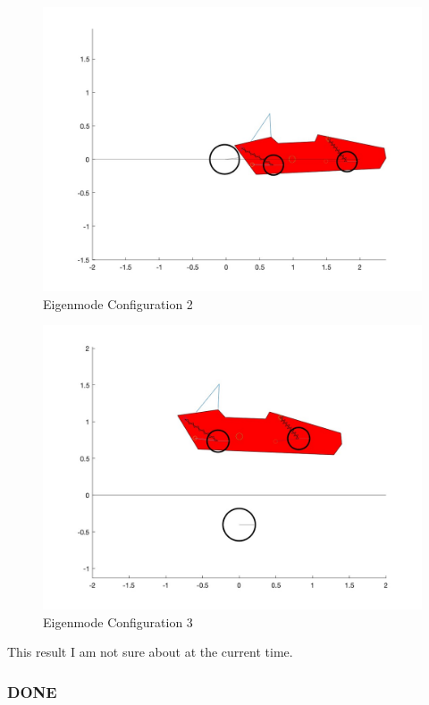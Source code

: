 \begin{figure}[ht]
    \centering
    \includegraphics[scale=0.235]{images/mode2.jpg}
    \caption{Eigenmode Configuration 2}
    \label{fig:mode_2}
\end{figure}

\begin{figure}[ht]
    \centering
    \includegraphics[scale=0.235]{images/mode3.jpg}
    \caption{Eigenmode Configuration 3}
    \label{fig:mode_3}
\end{figure}

This result I am not sure about at the current time.

\subsubsection{DONE}
